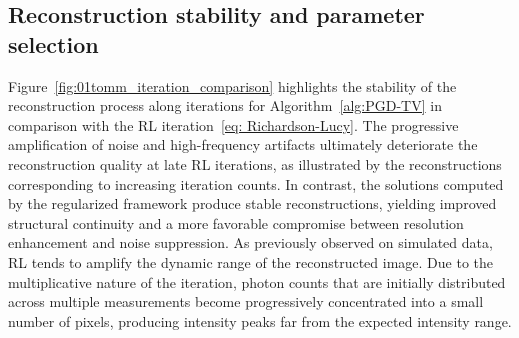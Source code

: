\documentclass[letterpaper]{article}
\begin{document}
\subsection{Reconstruction stability and parameter selection}

Figure~\ref{fig:01tomm_iteration_comparison} highlights the stability of the reconstruction process along iterations for Algorithm~\ref{alg:PGD-TV} in comparison with the RL iteration~\eqref{eq: Richardson-Lucy}. The progressive amplification of noise and high-frequency artifacts ultimately deteriorate the reconstruction quality at late RL iterations, as illustrated by the reconstructions corresponding to increasing iteration counts. In contrast, the solutions computed by the regularized framework produce stable reconstructions, yielding improved structural continuity and a more favorable compromise between resolution enhancement and noise suppression. 
As previously observed on simulated data, RL tends to amplify the dynamic range of the reconstructed image. Due to the multiplicative nature of the iteration, photon counts that are initially distributed across multiple measurements become progressively concentrated into a small number of pixels, producing intensity peaks far from the expected intensity range.



\end{document}
